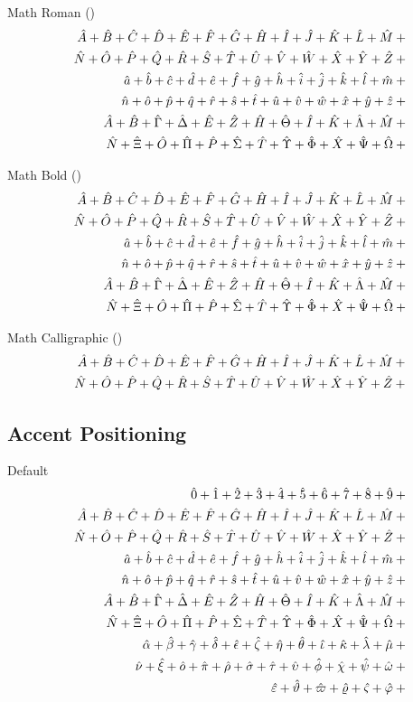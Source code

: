 Math Roman (\texttt{\string\mathrm})
\def\test#1{\mathrm{#1}_{i}+{}}%
\begin{eqnarray*}
  && {\testupperi}\\
  && {\testupperii}\\
  && {\testloweri}\\
  && {\testlowerii}\\
  && {\testupgreeki}\\
  && {\testupgreekii}
\end{eqnarray*}%


Math Bold (\texttt{\string\mathbf})
\def\test#1{\mathbf{#1}_{i}+{}}%
\begin{eqnarray*}
  && {\testupperi}\\
  && {\testupperii}\\
  && {\testloweri}\\
  && {\testlowerii}\\
  && {\testupgreeki}\\
  && {\testupgreekii}
\end{eqnarray*}%

Math Calligraphic (\texttt{\string\mathcal})
\def\test#1{\mathcal{#1}_{i}+{}}%
\begin{eqnarray*}
  && {\testupperi}\\
  && {\testupperii}
\end{eqnarray*}%


\subsection{Accent Positioning \showfamily}

Default
\def\test#1{\hat{#1}+{}}%
\begin{eqnarray*}
  && {\testnums}\\
  && {\testupperi}\\
  && {\testupperii}\\
  && {\testloweri}\\
  && {\testlowerii}\\
  && {\testupgreeki}\\
  && {\testupgreekii}\\
  && {\testlowgreeki}\\
  && {\testlowgreekii}\\
  && {\testlowgreekiii}
\end{eqnarray*}%

